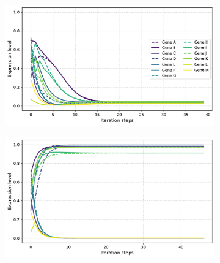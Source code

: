 \begin{figure}[H]
  \begin{subfigure}[t]{0.48\textwidth}
    \includegraphics[width=\textwidth]{alife/img/13genes_sigma_3.pdf}
    \label{subfig:alife:sigma_3}
  \end{subfigure}
  \begin{subfigure}[t]{0.48\textwidth}
    \includegraphics[width=\textwidth]{alife/img/13genes_sigma_2.pdf}
    \label{subfig:alife:sigma_2}
  \end{subfigure}
  \vspace{-5mm}


\end{figure}
